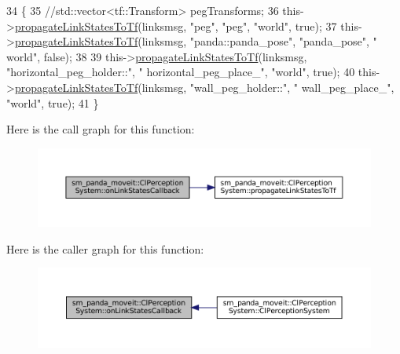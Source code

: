 \begin{DoxyCode}
34     \{
35         \textcolor{comment}{//std::vector<tf::Transform> pegTransforms;}
36         this->\hyperlink{classsm__panda__moveit_1_1ClPerceptionSystem_a0c02770eff276808972e341c939a9e97}{propagateLinkStatesToTf}(linksmsg, \textcolor{stringliteral}{"peg"}, \textcolor{stringliteral}{"peg"}, \textcolor{stringliteral}{"world"}, \textcolor{keyword}{true});
37         this->\hyperlink{classsm__panda__moveit_1_1ClPerceptionSystem_a0c02770eff276808972e341c939a9e97}{propagateLinkStatesToTf}(linksmsg, \textcolor{stringliteral}{"panda::panda\_pose"}, \textcolor{stringliteral}{"panda\_pose"}, \textcolor{stringliteral}{"
      world"}, \textcolor{keyword}{false});
38 
39         this->\hyperlink{classsm__panda__moveit_1_1ClPerceptionSystem_a0c02770eff276808972e341c939a9e97}{propagateLinkStatesToTf}(linksmsg, \textcolor{stringliteral}{"horizontal\_peg\_holder::"}, \textcolor{stringliteral}{"
      horizontal\_peg\_place\_"}, \textcolor{stringliteral}{"world"}, \textcolor{keyword}{true});
40         this->\hyperlink{classsm__panda__moveit_1_1ClPerceptionSystem_a0c02770eff276808972e341c939a9e97}{propagateLinkStatesToTf}(linksmsg, \textcolor{stringliteral}{"wall\_peg\_holder::"}, \textcolor{stringliteral}{"
      wall\_peg\_place\_"}, \textcolor{stringliteral}{"world"}, \textcolor{keyword}{true});
41     \}
\end{DoxyCode}
Here is the call graph for this function\+:
\nopagebreak
\begin{figure}[H]
\begin{center}
\leavevmode
\includegraphics[width=350pt]{classsm__panda__moveit_1_1ClPerceptionSystem_a017fd058419a7279487da03d180bb2d2_cgraph}
\end{center}
\end{figure}
Here is the caller graph for this function\+:
\nopagebreak
\begin{figure}[H]
\begin{center}
\leavevmode
\includegraphics[width=350pt]{classsm__panda__moveit_1_1ClPerceptionSystem_a017fd058419a7279487da03d180bb2d2_icgraph}
\end{center}
\end{figure}
